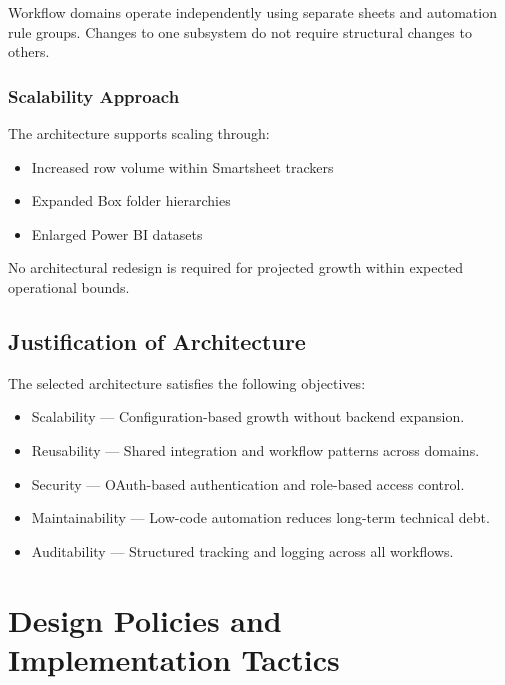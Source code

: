 \documentclass[12pt]{article}
\def\textbf#1{#1}%
\begin{document}
Workflow domains operate independently using separate sheets and automation rule groups. Changes to one subsystem do not require structural changes to others.

\subsubsection{Scalability Approach}

The architecture supports scaling through:

\begin{itemize}
    \item Increased row volume within Smartsheet trackers
    \item Expanded Box folder hierarchies
    \item Enlarged Power BI datasets
\end{itemize}

No architectural redesign is required for projected growth within expected operational bounds.

\subsection{Justification of Architecture}

The selected architecture satisfies the following objectives:

\begin{itemize}
    \item \textbf{Scalability} — Configuration-based growth without backend expansion.
    \item \textbf{Reusability} — Shared integration and workflow patterns across domains.
    \item \textbf{Security} — OAuth-based authentication and role-based access control.
    \item \textbf{Maintainability} — Low-code automation reduces long-term technical debt.
    \item \textbf{Auditability} — Structured tracking and logging across all workflows.
\end{itemize}


\section{Design Policies and Implementation Tactics}
\end{document}
